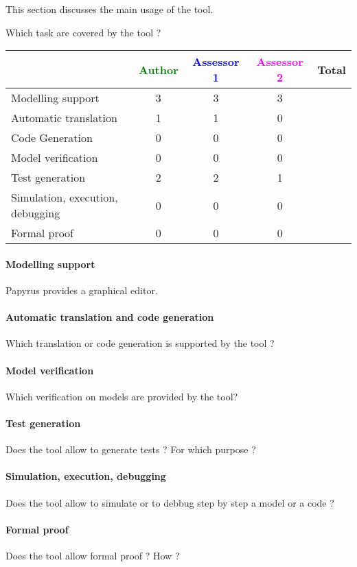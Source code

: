 This section discusses the main usage of the tool.

Which task are covered by the tool ?


\begin{tabular}{|l | c | c | c | c|}
\hline
& \textcolor{green}{Author} & \textcolor{blue}{Assessor 1} & \textcolor{magenta}{Assessor 2} & Total \\
\hline
Modelling support & 3 & 3 & 3 & \\
\hline
Automatic translation & 1 & 1 & 0 & \\
\hline
Code Generation & 0 & 0 & 0 & \\
\hline
Model verification & 0 & 0 & 0 & \\
\hline
Test generation & 2 & 2 & 1 & \\
\hline
Simulation, execution, debugging & 0 & 0 & 0 & \\
\hline
Formal proof & 0 & 0 & 0 & \\
\hline
\end{tabular}

\paragraph{Modelling support}
Papyrus provides a graphical editor.

\paragraph{Automatic translation and code generation}
Which translation or code generation is supported by the tool ?

\paragraph{Model verification}
Which verification on models are provided by the tool?

\paragraph{Test generation}
Does the tool allow to generate tests ? For which purpose ?

\paragraph{Simulation, execution, debugging}
Does the tool allow to simulate or to debbug step by step a model or a code ?

\paragraph{Formal proof}
Does the tool allow formal proof ? How ?


